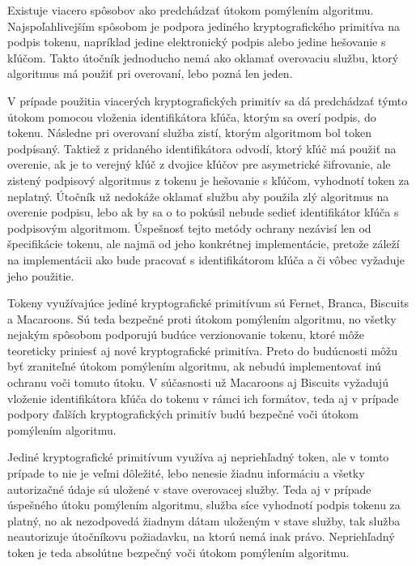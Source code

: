 Existuje viacero spôsobov ako predchádzať útokom pomýlením algoritmu. Najspoľahlivejším spôsobom je podpora jediného kryptografického primitíva na podpis tokenu, napríklad jedine elektronický podpis alebo jedine hešovanie s kľúčom. Takto útočník jednoducho nemá ako oklamať overovaciu službu, ktorý algoritmus má použiť pri overovaní, lebo pozná len jeden. 

V prípade použitia viacerých kryptografických primitív sa dá predchádzať týmto útokom pomocou vloženia identifikátora kľúča, ktorým sa overí podpis, do tokenu. Následne pri overovaní služba zistí, ktorým algoritmom bol token podpísaný. Taktiež z pridaného identifikátora odvodí, ktorý kľúč má použiť na overenie, ak je to verejný kľúč z dvojice kľúčov pre asymetrické šifrovanie, ale zistený podpisový algoritmus z tokenu je hešovanie s kľúčom, vyhodnotí token za neplatný. Útočník už nedokáže oklamať službu aby použila zlý algoritmus na overenie podpisu, lebo ak by sa o to pokúsil nebude sedieť identifikátor kľúča s podpisovým algoritmom. Úspešnosť tejto metódy ochrany nezávisí len od špecifikácie tokenu, ale najmä od jeho konkrétnej implementácie, pretože záleží na implementácii ako bude pracovať s identifikátorom kľúča a či vôbec vyžaduje jeho použitie.

Tokeny využívajúce jediné kryptografické primitívum sú Fernet, Branca, Biscuits a Macaroons. Sú teda bezpečné proti útokom pomýlením algoritmu, no všetky nejakým spôsobom podporujú budúce verzionovanie tokenu, ktoré môže teoreticky priniesť aj nové kryptografické primitíva. Preto do budúcnosti môžu byť zraniteľné útokom pomýlením algoritmu, ak nebudú implementovať inú ochranu voči tomuto útoku. V súčasnosti už Macaroons aj Biscuits vyžadujú vloženie identifikátora kľúča do tokenu v rámci ich formátov, teda aj v prípade podpory ďalších kryptografických primitív budú bezpečné voči útokom pomýlením algoritmu.

Jediné kryptografické primitívum využíva aj nepriehľadný token, ale v tomto prípade to nie je veľmi dôležité, lebo nenesie žiadnu informáciu a všetky autorizačné údaje sú uložené v stave overovacej služby. Teda aj v prípade úspešného útoku pomýlením algoritmu, služba síce vyhodnotí podpis tokenu za platný, no ak nezodpovedá žiadnym dátam uloženým v stave služby, tak služba neautorizuje útočníkovu požiadavku, na ktorú nemá inak právo. Nepriehľadný token je teda absolútne bezpečný voči útokom pomýlením algoritmu.

